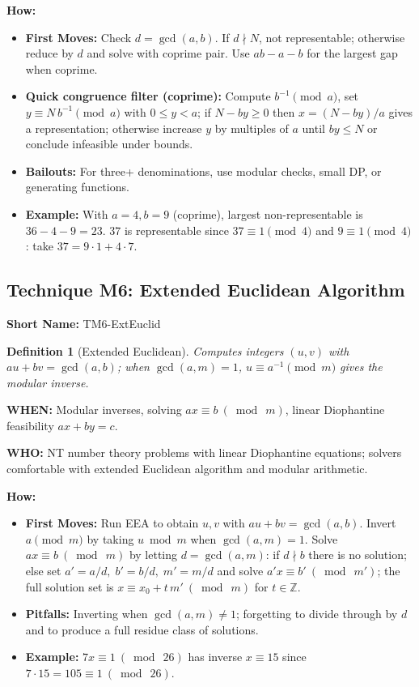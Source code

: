 \documentclass[12pt]{article}
\newtheorem{definition}{Definition}[section]
\begin{document}
\textbf{How:}
\begin{itemize}
    \item \textbf{First Moves:} Check $d=\gcd(a,b)$. If $d\nmid N$, not representable; otherwise reduce by $d$ and solve with coprime pair. Use $ab-a-b$ for the largest gap when coprime.
    \item \textbf{Quick congruence filter (coprime):} Compute $b^{-1}\pmod a$, set $y \equiv N\,b^{-1} \pmod a$ with $0\le y < a$; if $N - b y \ge 0$ then $x=(N-b y)/a$ gives a representation; otherwise increase $y$ by multiples of $a$ until $b y \le N$ or conclude infeasible under bounds.
    \item \textbf{Bailouts:} For three+ denominations, use modular checks, small DP, or generating functions.
    \item \textbf{Example:} With $a=4,b=9$ (coprime), largest non\mbox{-}representable is $36-4-9=23$. $37$ is representable since $37\equiv 1\pmod 4$ and $9\equiv 1\pmod 4$: take $37=9\cdot 1+4\cdot 7$.
\end{itemize}

\subsection{Technique M6: Extended Euclidean Algorithm}
\textbf{Short Name:} TM6-ExtEuclid

\begin{definition}[Extended Euclidean]
Computes integers $(u,v)$ with $au+bv=\gcd(a,b)$; when $\gcd(a,m)=1$, $u\equiv a^{-1}\pmod m$ gives the modular inverse.
\end{definition}

\textbf{WHEN:} Modular inverses, solving $ax\equiv b\ (\bmod\ m)$, linear Diophantine feasibility $ax+by=c$.

\textbf{WHO:} NT number theory problems with linear Diophantine equations; solvers comfortable with extended Euclidean algorithm and modular arithmetic.

\textbf{How:}
\begin{itemize}
    \item \textbf{First Moves:} Run EEA to obtain $u,v$ with $au+bv=\gcd(a,b)$. Invert $a\pmod m$ by taking $u\bmod m$ when $\gcd(a,m)=1$. Solve $ax\equiv b\ (\bmod\ m)$ by letting $d=\gcd(a,m)$: if $d\nmid b$ there is no solution; else set $a'=a/d,\; b'=b/d,\; m'=m/d$ and solve $a' x\equiv b'\ (\bmod\ m')$; the full solution set is $x\equiv x_0 + t\,m'\ (\bmod\ m)$ for $t\in\mathbb{Z}$.
    \item \textbf{Pitfalls:} Inverting when $\gcd(a,m)\ne 1$; forgetting to divide through by $d$ and to produce a full residue class of solutions.
    \item \textbf{Example:} $7x\equiv 1\ (\bmod\ 26)$ has inverse $x\equiv 15$ since $7\cdot 15=105\equiv 1\ (\bmod\ 26)$.
\end{itemize}
\end{document}
